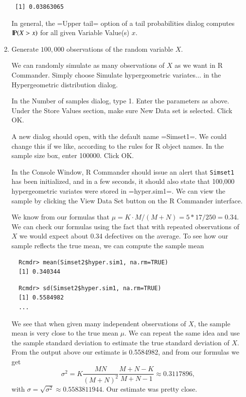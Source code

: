\documentclass[captions=tableheading]{scrbook}
\begin{document}
\begin{enumerate}
\begin{verbatim}
 [1] 0.03863065
\end{verbatim}

In general, the =Upper tail= option of a tail probabilities dialog computes \(\P(X>x)\) for all given \textsf{Variable Value(s)} \(x\).

\item Generate \(100,000\) observations of the random variable \(X\).


We can randomly simulate as many observations of \(X\) as we want in \textsf{R} Commander. Simply choose \textsf{Simulate hypergeometric variates}... in the \textsf{Hypergeometric distribution} dialog. 

In the \textsf{Number of samples} dialog, type 1. Enter the parameters as above. Under the \textsf{Store Values} section, make sure \textsf{New Data set} is selected. Click \textsf{OK}. 

A new dialog should open, with the default name =Simset1=.  We could change this if we like, according to the rules for \textsf{R} object names. In the sample size box, enter 100000. Click \textsf{OK}. 

In the Console Window, \textsf{R} Commander should issue an alert that \texttt{Simset1} has been initialized, and in a few seconds, it should also state that 100,000 hypergeometric variates were stored in =hyper.sim1=. We can view the sample by clicking the \textsf{View Data Set} button on the \textsf{R} Commander interface.

We know from our formulas that \(\mu=K\cdot M/(M+N)=5*17/250=0.34\). We can check our formulas using the fact that with repeated observations of \(X\) we would expect about 0.34 defectives on the average. To see how our sample reflects the true mean, we can compute the sample mean

\begin{verbatim}
  Rcmdr> mean(Simset2$hyper.sim1, na.rm=TRUE)
  [1] 0.340344
\end{verbatim}

\begin{verbatim}
  Rcmdr> sd(Simset2$hyper.sim1, na.rm=TRUE)
  [1] 0.5584982
  ...
\end{verbatim}

We see that when given many independent observations of \(X\), the sample mean is very close to the true mean \(\mu\). We can repeat the same idea and use the sample standard deviation to estimate the true standard deviation of \(X\). From the output above our estimate is 0.5584982, and from our formulas we get
\[
\sigma^{2}=K\frac{MN}{(M+N)^{2}}\frac{M+N-K}{M+N-1}\approx0.3117896,
\]
with \(\sigma=\sqrt{\sigma^{2}}\approx0.5583811944\). Our estimate was pretty close.


\end{enumerate}
\end{document}
